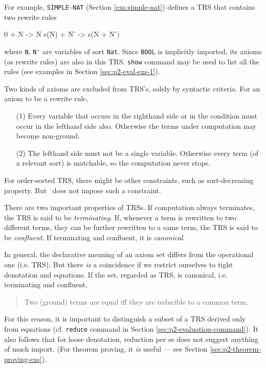 \documentclass[a4paper]{memoir}
\begin{document}
For example, \verb|SIMPLE-NAT| (Section \ref{exs:simple-nat})
defines a TRS that contains two rewrite rules
\begin{vvtm}
\begin{ccode}
  0 + N -> N
  s(N) + N' -> s(N + N')
\end{ccode}
\end{vvtm}
where \verb|N|, \verb|N'| are variables of sort \verb|Nat|.
Since \verb|BOOL| is implicitly imported, its axioms (as rewrite rules)
are also in this TRS. \verb|show| command may be used to list all
the rules (see examples in Section \ref{sec:p2-eval-exs-1}).

Two kinds of axioms are excluded from TRS's, solely
by syntactic criteria. For an axiom to be a rewrite rule,
\begin{itemize}
\item[(1)] Every variable that occurs in the righthand side or in the
  condition must occur in the lefthand side also. Otherwise the terms
  under computation may become non-ground.
\item[(2)] The lefthand side must not be a single variable. Otherwise
  every term (of a relevant sort) is matchable, so the computation never
  stops.
\end{itemize}
For order-sorted TRS, there might be other constraints, such as
sort-decreasing property. But \cafeobj~does not impose such a constraint.

There are two important properties of TRSs.
If computation always terminates, the TRS is said to be {\em terminating}.
 If, whenever a term is rewritten to two different
terms, they can be further rewritten to a same term, the TRS is said to
be {\em confluent}. If terminating and confluent, it is
{\em canonical}.

In general, the declarative meaning of
an axiom set differs from the operational one (i.e. TRS). But
there {\em is} a coincidence if we restrict ourselves to tight
denotation and equations.
If the set, regarded as TRS, is canonical, i.e. terminating and confluent,
\begin{quote}
Two (ground) terms are equal iff they are reducible to a common term.
\end{quote}
For this reason, it is important to distinguish a subset of
a TRS derived only from equations (cf. \verb|reduce| command in
Section \ref{sec:p2-evaluation-command}). It also follows that
for loose denotation, reduction per se does not suggest anything
of much import. (For theorem proving, it {\em is} useful --- see
Section \ref{sec:p2-theorem-proving-exs}).
\end{document}
